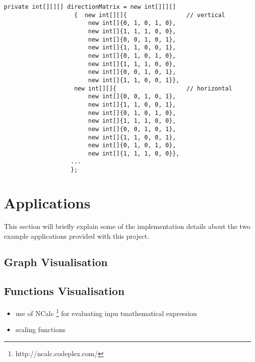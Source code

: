 \lstset{style=sharpc1}
\begin{lstlisting}[caption={Tactons - Initial approach},label={lst:basicAPIUsage}]
private int[][][] directionMatrix = new int[][][]
                    {  new int[][]{                 // vertical 
                        new int[]{0, 1, 0, 1, 0}, 
                        new int[]{1, 1, 1, 0, 0}, 
                        new int[]{0, 0, 1, 0, 1}, 
                        new int[]{1, 1, 0, 0, 1}, 
                        new int[]{0, 1, 0, 1, 0}, 
                        new int[]{1, 1, 1, 0, 0}, 
                        new int[]{0, 0, 1, 0, 1}, 
                        new int[]{1, 1, 0, 0, 1}}, 
                    new int[][]{                    // horizontal
                        new int[]{0, 0, 1, 0, 1},
                        new int[]{1, 1, 0, 0, 1},
                        new int[]{0, 1, 0, 1, 0},
                        new int[]{1, 1, 1, 0, 0},
                        new int[]{0, 0, 1, 0, 1},
                        new int[]{1, 1, 0, 0, 1},
                        new int[]{0, 1, 0, 1, 0},
                        new int[]{1, 1, 1, 0, 0}},
                   ...
                   };
\end{lstlisting}

\section{Applications}
\label{sec:Applications}

This section will briefly explain some of the implementation details about the two example applications provided with this project.

\subsection{Graph Visualisation}

\subsection{Functions Visualisation}

\begin{itemize}
\item use of NCalc \footnote{http://ncalc.codeplex.com/} for evaluating inpu tmathematical expression
\item scaling functions
\end{itemize}



